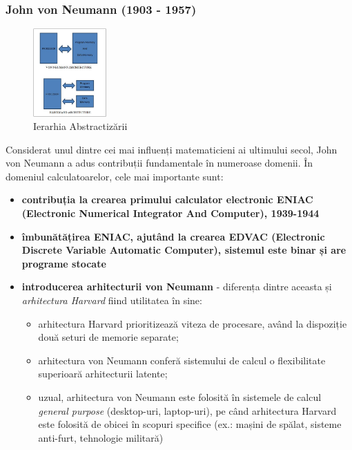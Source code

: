 \documentclass[a4paper,10pt]{article}
\begin{document}
\subsubsection{John von Neumann (1903 - 1957)}
\begin{figure}
    \centering
    \includegraphics[width=0.25\textwidth]{resources/von_neumann_and_harvard_architecture.jpg}
    \caption{Ierarhia Abstractizării}
\end{figure}
Considerat unul dintre cei mai influenți matematicieni ai ultimului secol, John von Neumann a adus contribuții fundamentale în numeroase domenii. În domeniul calculatoarelor, cele mai importante sunt:
\begin{itemize}
    \item \textbf{contribuția la crearea primului calculator electronic ENIAC (Electronic Numerical Integrator And Computer), 1939-1944}
    \item \textbf{îmbunătățirea ENIAC, ajutând la crearea EDVAC (Electronic Discrete Variable Automatic Computer), sistemul este binar și are programe stocate}
    \item \textbf{introducerea arhitecturii von Neumann} - diferența dintre aceasta și \textit{arhitectura Harvard} fiind utilitatea în sine:
    \begin{itemize}
        \item arhitectura Harvard prioritizează viteza de procesare, având la dispoziție două seturi de memorie separate;
        \item arhitectura von Neumann conferă sistemului de calcul o flexibilitate superioară arhitecturii latente;
        \item uzual, arhitectura von Neumann este folosită în sistemele de calcul \textit{general purpose} (desktop-uri, laptop-uri), pe când arhitectura Harvard este folosită de obicei în scopuri specifice (ex.: mașini de spălat, sisteme anti-furt, tehnologie militară)
    \end{itemize}
\end{itemize}
\end{document}
